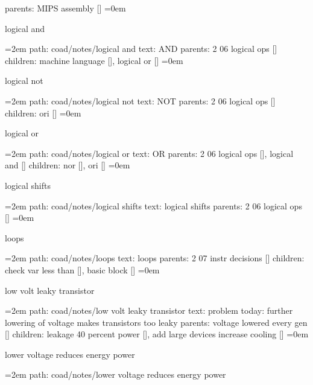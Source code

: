 \smallskip
parents:  MIPS assembly []
\smallskip
\leftskip=0em
\par\endgroup
\bigskip
{}
logical and
\smallskip
\par\begingroup
\leftskip=2em
path: coad/notes/logical and
\smallskip
text:  AND
\smallskip
parents:  2 06 logical ops []
\smallskip
children: machine language [], logical or []
\smallskip
\leftskip=0em
\par\endgroup
\bigskip
{}
logical not
\smallskip
\par\begingroup
\leftskip=2em
path: coad/notes/logical not
\smallskip
text:  NOT
\smallskip
parents:  2 06 logical ops []
\smallskip
children: ori []
\smallskip
\leftskip=0em
\par\endgroup
\bigskip
{}
logical or
\smallskip
\par\begingroup
\leftskip=2em
path: coad/notes/logical or
\smallskip
text:  OR
\smallskip
parents:  2 06 logical ops [], logical and []
\smallskip
children: nor [], ori []
\smallskip
\leftskip=0em
\par\endgroup
\bigskip
{}
logical shifts
\smallskip
\par\begingroup
\leftskip=2em
path: coad/notes/logical shifts
\smallskip
text:  logical shifts
\smallskip
parents:  2 06 logical ops []
\smallskip
\leftskip=0em
\par\endgroup
\bigskip
{}
loops
\smallskip
\par\begingroup
\leftskip=2em
path: coad/notes/loops
\smallskip
text:  loops
\smallskip
parents:  2 07 instr decisions []
\smallskip
children: check var less than [], basic block []
\smallskip
\leftskip=0em
\par\endgroup
\bigskip
{}
low volt leaky transistor
\smallskip
\par\begingroup
\leftskip=2em
path: coad/notes/low volt leaky transistor
\smallskip
text:  problem today: further lowering of voltage makes transistors too leaky
\smallskip
parents:  voltage lowered every gen []
\smallskip
children: leakage 40 percent power [], add large devices increase cooling []
\smallskip
\leftskip=0em
\par\endgroup
\bigskip
{}
lower voltage reduces energy power
\smallskip
\par\begingroup
\leftskip=2em
path: coad/notes/lower voltage reduces energy power
\smallskip
